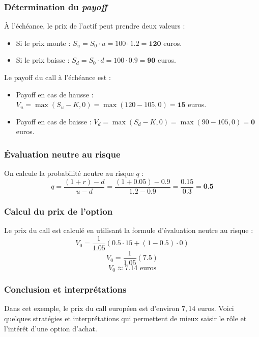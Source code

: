 \documentclass[12pt,a4paper]{article}
\begin{document}
\subsubsection{Détermination du \textit{payoff}}
À l'échéance, le prix de l'actif peut prendre deux valeurs :
\begin{itemize}
    \item Si le prix monte : \( S_u = S_0 \cdot u = 100 \cdot 1.2 = \textbf{120} \) euros.
    \item Si le prix baisse : \( S_d = S_0 \cdot d = 100 \cdot 0.9 = \textbf{90} \) euros.
\end{itemize}

Le payoff du call à l'échéance est :
\begin{itemize}
    \item Payoff en cas de hausse : \( V_u = \max(S_u - K, 0) = \max(120 - 105, 0) = \textbf{15} \) euros.
    \item Payoff en cas de baisse : \( V_d = \max(S_d - K, 0) = \max(90 - 105, 0) = \textbf{0} \) euros.
\end{itemize}

\subsubsection{Évaluation neutre au risque}
On calcule la probabilité neutre au risque \( q \) :
\[ q = \frac{(1 + r) - d}{u - d} = \frac{(1 + 0.05) - 0.9}{1.2 - 0.9} = \frac{0.15}{0.3} = \textbf{0.5} \]

\subsubsection{Calcul du prix de l'option}
Le prix du call est calculé en utilisant la formule d'évaluation neutre au risque :
\[ V_0 = \frac{1}{1.05} \left( 0.5 \cdot 15 + (1 - 0.5) \cdot 0 \right) \]
\[ V_0 = \frac{1}{1.05} \left( 7.5 \right) \]
\[ \boxed{V_0 \approx 7.14 \text{ euros}} \]

\subsubsection{Conclusion et interprétations}

Dans cet exemple, le prix du call européen est d’environ \( 7{,}14 \) euros. Voici quelques stratégies et interprétations qui permettent de mieux saisir le rôle et l’intérêt d’une option d’achat.
\end{document}
